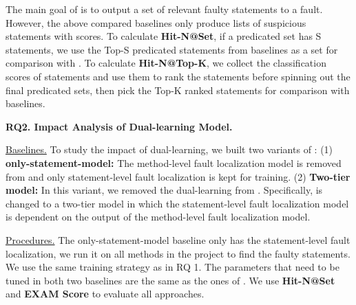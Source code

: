 The main goal of {\tool} is to output a set of relevant faulty statements to a fault. However, the above compared baselines only produce lists of suspicious statements with scores. 
To calculate \textbf{Hit-N@Set}, if a predicated set has S statements, we use the Top-S predicated statements from baselines as a set for comparison with {\tool}. To calculate {\bf Hit-N@Top-K}, we collect the classification scores of statements and use them to rank the statements before spinning out the final predicated sets, then pick the Top-K ranked statements for comparison with baselines.



{\bf RQ2. Impact Analysis of Dual-learning Model.}

\underline{Baselines.} To study the impact of dual-learning, we built two variants of {\tool}: 
(1) \textbf{only-statement-model:} %
The method-level fault localization model is removed from {\tool} and only statement-level fault localization is kept for training.
(2) \textbf{Two-tier model:} In this variant, we removed the dual-learning from {\tool}. Specifically, {\tool} is changed to a two-tier model in which the statement-level fault localization model is dependent on the output of the method-level fault localization model.

\underline{Procedures.} The only-statement-model baseline only has the statement-level fault localization, we run it on all methods in the project to find the faulty statements. 
We use the same training strategy as in RQ 1. 
The parameters that need to be tuned in both two baselines are the same as the ones of \tool. 
We use \textbf{Hit-N@Set} and \textbf{EXAM Score} to evaluate all approaches.


